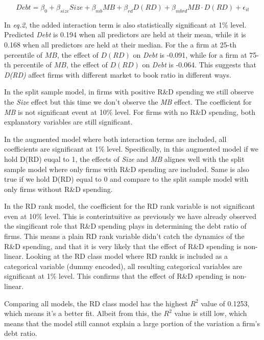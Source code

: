 \documentclass{article}
\begin{document}
\begin{equation}
    Debt = \beta_0 + \beta_{size} Size + \beta_{mb} MB + \beta_{rd} D(RD) + \beta_{mbrd} MB \cdot D(RD) + \epsilon_{it}
\end{equation}

In \textit{eq.2}, the added interaction term is also statistically significant at 1\% level. Predicted \textit{Debt} is 0.194
when all predictors are held at their mean, while it is 0.168 when all predictors are held at their median. For the a firm at 25-th
percentile of $MB$, the effect of $D(RD)$ on \textit{Debt} is -0.091, while for a firm at 75-th percentile of $MB$, the effect of $D(RD)$ on \textit{Debt} is
-0.064. This suggests that \textit{D(RD)} affect firms with different market to book ratio in different ways.

In the split sample model, in firms with positive R\&D spending we still observe the \textit{Size} effect but this time we don't
observe the \textit{MB} effect. The coefficient for \textit{MB} is not significant event at 10\% level. For firms with no R\&D spending,
both explanatory variables are still significant.

In the augmented model where both interaction terms are included, all coefficients are significant at 1\% level.
Specifically, in this augmented model if we hold D(RD) euqal to 1, the effects of \textit{Size} and \textit{MB} alignes well with
the split sample model where only firms with R\&D spending are included. Same is also true if we hold D(RD) equal to 0 and compare to the
split sample model with only firms without R\&D spending.

In the RD rank model, the coefficient for the RD rank variable is not significant even at 10\% level. This is conterintuitive
as previously we have already observed the singificant role that R\&D spending plays in determining the debt ratio of firms.
This means a plain RD rank variable didn't catch the dynamics of the R\&D spending, and that it is very likely that the effect of R\&D spending
is non-linear. Looking at the RD class model where RD rankk is included as a categorical variable (dummy encoded),
all resulting categorical variables are significant at 1\% level. This confirms that the effect of R\&D spending is non-linear.

Comparing all models, the RD class model has the highest $R^2$ value of 0.1253, which means it's a better fit.
Albeit from this, the $R^2$ value is still low, which means that the model still cannot explain a large portion of the variation a firm's debt ratio.
\end{document}
